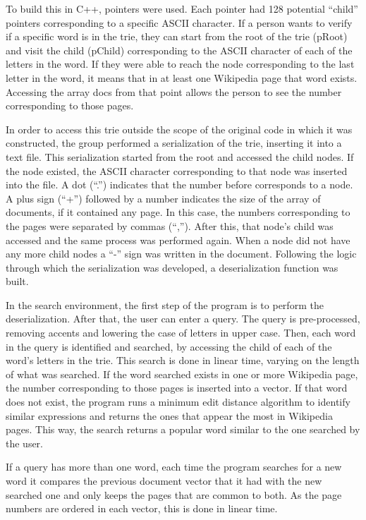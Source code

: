 \documentclass{article}
\begin{document}
To build this in C++, pointers were used. Each pointer had 128 potential ``child'' pointers corresponding to a specific ASCII character. If a person wants to verify if a specific word is in the trie, they can start from the root of the trie (pRoot) and visit the child (pChild) corresponding to the ASCII character of each of the letters in the word. If they were able to reach the node corresponding to the last letter in the word, it means that in at least one Wikipedia page that word exists. Accessing the array docs from that point allows the person to see the number corresponding to those pages.


In order to access this trie outside the scope of the original code in which it was constructed, the group performed a serialization of the trie, inserting it into a text file. This serialization started from the root and accessed the child nodes. If the node existed, the ASCII character corresponding to that node was inserted into the file. A dot (``.'') indicates that the number before corresponds to a node. A plus sign (``+'') followed by a number indicates the size of the array of documents, if it contained any page. In this case, the numbers corresponding to the pages were separated by commas (``,''). After this, that node's child was accessed and the same process was performed again. When a node did not have any more child nodes a ``-'' sign was written in the document. Following the logic through which the serialization was developed, a deserialization function was built. 

In the search environment, the first step of the program is to perform the deserialization. After that, the user can enter a query.  The query is pre-processed, removing accents and lowering the case of letters in upper case. Then, each word in the query is identified and searched, by accessing the child of each of the word's letters in the trie. This search is done in linear time, varying on the length of what was searched. If the word searched exists in one or more Wikipedia page, the number corresponding to those pages is inserted into a vector. If that word does not exist, the program runs a minimum edit distance algorithm to identify similar expressions and returns the ones that appear the most in Wikipedia pages. This way, the search returns a popular word similar to the one searched by the user. 

If a query has more than one word, each time the program searches for a new word it compares the previous document vector that it had with the new searched one and only keeps the pages that are common to both. As the page numbers are ordered in each vector, this is done in linear time. 
\end{document}
